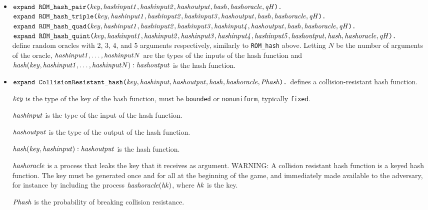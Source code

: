 \documentclass{article}
\begin{document}
\begin{itemize}
 \item
   $\texttt{expand ROM\_hash\_pair(}\mathit{key}, \mathit{hashinput1}, \mathit{hashinput2}, \mathit{hashoutput}, \mathit{hash}, \mathit{hashoracle}, \mathit{qH}\texttt{).}$\\
   $\texttt{expand ROM\_hash\_triple(}\mathit{key}, \mathit{hashinput1}, \mathit{hashinput2}, \mathit{hashinput3}, \mathit{hashoutput}, \mathit{hash}, \mathit{hashoracle}, \mathit{qH}\texttt{).}$\\
$\texttt{expand ROM\_hash\_quad(}\mathit{key}, \mathit{hashinput1}, \mathit{hashinput2}, \mathit{hashinput3}, \mathit{hashinput4}, \mathit{hashoutput}, \mathit{hash}, \mathit{hashoracle}, \mathit{qH}\texttt{).}$\\
$\texttt{expand ROM\_hash\_quint(}\mathit{key}, \mathit{hashinput1}, \mathit{hashinput2}, \mathit{hashinput3}, \mathit{hashinput4}, \mathit{hashinput5}, \mathit{hashoutput}, \mathit{hash}, \mathit{hashoracle}, \mathit{qH}\texttt{).}$\\
   define random oracles with 2, 3, 4, and 5 arguments respectively, similarly to \texttt{ROM\_hash} above.
   Letting $N$ be the number of arguments of the oracle,
   $\mathit{hashinput1},\dots,\mathit{hashinput}N$ are the types of the inputs of the hash function and
   $\mathit{hash}(\mathit{key}, \mathit{hashinput1}, \dots, \mathit{hashinput}N): \mathit{hashoutput}$ is the hash function.

\item $\texttt{expand CollisionResistant\_hash(}\mathit{key}, \mathit{hashinput}, \mathit{hashoutput}, \mathit{hash}, \mathit{hashoracle}, \mathit{Phash}\texttt{).}$
defines a collision-resistant hash function.

   $\mathit{key}$ is the type of the key of the hash function, must be \texttt{bounded} or \texttt{nonuniform}, typically \texttt{fixed}.

   $\mathit{hashinput}$ is the type of the input of the hash function.

   $\mathit{hashoutput}$ is the type of the output of the hash function.

   $\mathit{hash}(\mathit{key}, \mathit{hashinput}): \mathit{hashoutput}$ is the hash function.

   $\mathit{hashoracle}$ is a process that leaks the key that it receives as argument.
   WARNING: A collision resistant hash function is a keyed hash function.
   The key must be generated once and for all at the beginning of the game,
   and immediately made available to the adversary, for instance
   by including the process $\mathit{hashoracle}(\mathit{hk})$,
   where $\mathit{hk}$ is the key.

   $\mathit{Phash}$ is the probability of breaking collision resistance.


\end{itemize}
\end{document}
